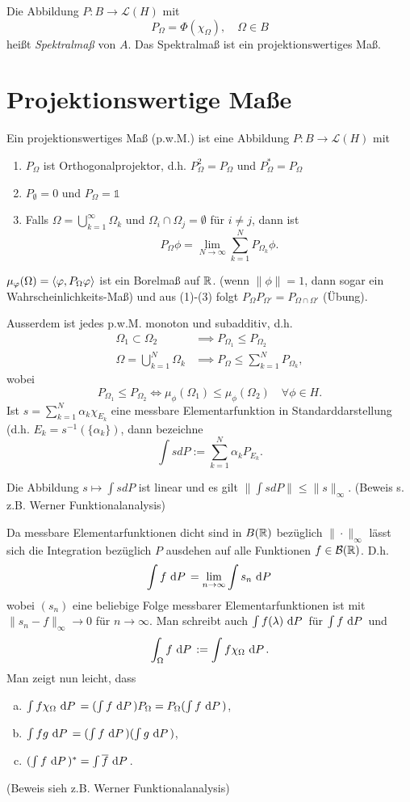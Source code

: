 \documentclass{mycourse}
\begin{document}
Die Abbildung $P: B \to \mathcal L(H)$ mit
\[
P_\Omega= \Phi(\chi_\Omega), \quad \Omega \in B
\]
heißt \emph{Spektralmaß} von $A$. Das Spektralmaß ist ein projektionswertiges Maß.

\section{Projektionswertige Maße}
Ein projektionswertiges Maß (p.w.M.) ist eine Abbildung $P: B \to \mathcal L(H)$ mit
\begin{enumerate}[(1)]
\item $P_\Omega$ ist Orthogonalprojektor, d.h. $P_\Omega^2 = P_\Omega$ und $P_\Omega^* = P_\Omega$
\item $P_\emptyset=0$ und $P_\Omega =\mathbb 1$
\item Falls $\Omega = \bigcup_{k=1}^\infty \Omega_k$ und $\Omega_i \cap \Omega_j=\emptyset$ für $i\neq j$, dann ist
\[
P_\Omega \phi = \lim_{N\to \infty} \sum_{k=1}^N P_{\Omega_k} \phi.
\] 

\end{enumerate} 
$\mu_\phi(\Omega)=\< \phi, P_\Omega \phi \>$ ist ein Borelmaß auf $\R$. (wenn $\|\phi \|=1$, dann sogar ein Wahrscheinlichkeits-Maß) und aus (1)-(3) folgt $P_\Omega P_{\Omega'}= P_{\Omega \cap \Omega'}$ (Übung).

Ausserdem ist jedes p.w.M. monoton und subadditiv, d.h.
\begin{align*}
\Omega_1 \subset \Omega_2 &\implies P_{\Omega_1} \le P_{\Omega_2}\\
\Omega= \bigcup_{k=1}^N \Omega_k &\implies P_\Omega \le \sum_{k=1}^N P_{\Omega_k},
\end{align*}
wobei 
\[
P_{\Omega_1} \le P_{\Omega_2} \iff \mu_\phi(\Omega_1) \le \mu_\phi (\Omega_2) \quad \forall \phi \in H.
\]
Ist $s= \sum_{k=1}^N \alpha_k \chi_{E_k}$ eine messbare Elementarfunktion in Standarddarstellung (d.h. $E_k = s^{-1}(\{\alpha_k\})$, dann bezeichne
\[
\int s dP:= \sum_{k=1}^N \alpha_k P_{E_k}.
\]

Die Abbildung $s\mapsto \int s dP$ ist linear und es gilt $\| \int s dP \| \le \| s\|_\infty$. (Beweis s. z.B. Werner Funktionalanalysis)

Da messbare Elementarfunktionen dicht sind in $B(\R)$ bezüglich $\| \cdot \|_\infty$ lässt sich die Integration bezüglich $P$ ausdehen auf alle Funktionen $f\in \mathcal B(\R)$. D.h.
\[
\int f \, \dx[P] = \lim_{n\to \infty} \int s_n \, \dx[P]
\]
wobei $(s_n)$ eine beliebige Folge messbarer Elementarfunktionen ist mit $\| s_n-f\|_\infty\to 0$ für $n\to \infty$. Man schreibt auch $\int f(\lambda) \, \dx[P]$ für $\int f \,\dx[P]$ und
\[
\int_\Omega f \, \dx[P] := \int f \chi_\Omega \, \dx[P].
\]
Man zeigt nun leicht, dass
\begin{enumerate}[a)]
\item $\int f \chi_\Omega \, \dx[P] = (\int f \, \dx[P]) P_\Omega = P_\Omega ( \int f \, \dx[P])$,
\item $\int fg \, \dx[P]= (\int f \, \dx[P]) (\int g \, \dx[P])$, 
\item $(\int f \, \dx[P])^*= \int \overline{f} \, \dx[P]$.
\end{enumerate}
(Beweis sieh z.B. Werner Funktionalanalysis)
\end{document}
